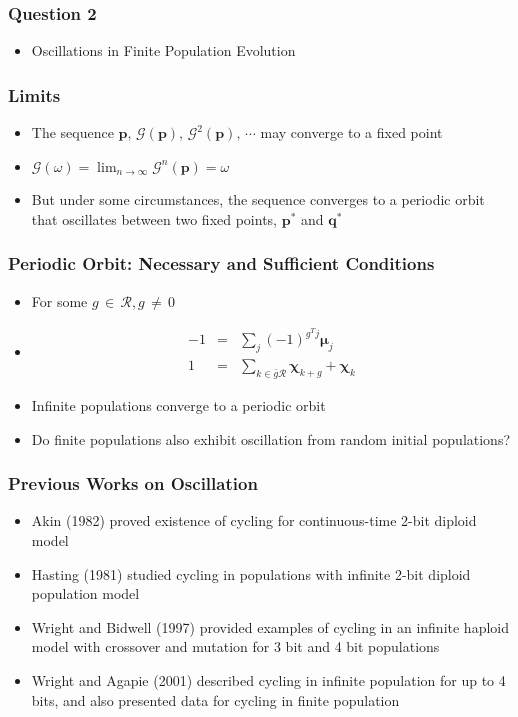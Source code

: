 \documentclass[aspectratio=169]{beamer}
\begin{document}
  \begin{frame}
    \frametitle{Question 2}
    \begin{itemize}
      \item{Oscillations in Finite Population Evolution}      
    \end{itemize}
  \end{frame}
  
  \begin{frame}
    \frametitle{Limits}
    \begin{itemize}
      \item{The sequence $\bm{p}, \, \mathcal{G}(\bm{p}), \, {\mathcal{G}}^2(\bm{p}), \, \cdots$ may converge to a fixed point }  
      \item{$\mathcal{G}(\omega) = \lim_{n\to\infty} \mathcal{G}^n(\bm{p}) = \omega$}
      \item{But under some circumstances, the sequence converges to a periodic orbit that oscillates between two fixed points, $\bm{p}^\ast$ and $\bm{q}^\ast$}
    \end{itemize}
  \end{frame}
  
  \begin{frame}
    \frametitle{Periodic Orbit: Necessary and Sufficient Conditions}
    \begin{itemize}
      \item{For some $g \,\in\, \mathcal{R} , g \,\neq\, 0$}    
      \item{
      \begin{eqnarray*}
      -1 &=& \sum \limits_{j} (-1)^{g^T j} \bm{\mu}_j \\
      1 &=& \sum \limits_{k \in \bar{g}\mathcal{R}} \bm{\chi}_{k+g} + \bm{\chi}_k 
      \end{eqnarray*}
      }
      \item{Infinite populations converge to a periodic orbit }
      \item{Do finite populations also exhibit oscillation from random initial populations?}
    \end{itemize}
  \end{frame}  
  
  \begin{frame}
    \frametitle{Previous Works on Oscillation}
    \begin{itemize}
      \item{Akin (1982) proved existence of cycling for continuous-time 2-bit diploid model}  
      \item{Hasting (1981) studied cycling in populations with infinite 2-bit diploid population model}
      \item{Wright and Bidwell (1997) provided examples of cycling in an infinite haploid model 
      with crossover and mutation for 3 bit and 4 bit populations }
      \item{Wright and Agapie (2001) described cycling in infinite population for up to 4 bits, 
      and also presented data for cycling in finite population}
    \end{itemize}
  \end{frame}
  
\end{document}
